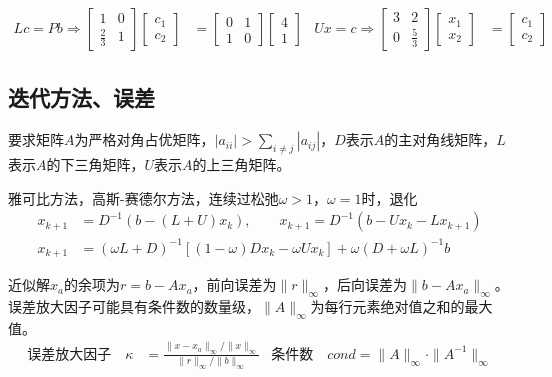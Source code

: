 \documentclass[twocolumn]{article}
\begin{document}
\begin{align*}
    Lc=Pb\Rightarrow
    \begin{bmatrix}
        1           & 0 \\
        \frac{2}{3} & 1
    \end{bmatrix}
    \begin{bmatrix}
        c_1 \\
        c_2
    \end{bmatrix}
     & =
    \begin{bmatrix}
        0 & 1 \\
        1 & 0
    \end{bmatrix}
    \begin{bmatrix}
        4 \\
        1
    \end{bmatrix}
     &
    Ux=c \Rightarrow
    \begin{bmatrix}
        3 & 2           \\
        0 & \frac{5}{3}
    \end{bmatrix}
    \begin{bmatrix}
        x_1 \\
        x_2
    \end{bmatrix}
     & =
    \begin{bmatrix}
        c_1 \\
        c_2
    \end{bmatrix}
\end{align*}

\subsection{迭代方法、误差}
要求矩阵$A$为严格对角占优矩阵，$|a_{ii}|>\sum_{i\neq j}|a_{ij}|$，$D$表示$A$的主对角线矩阵，$L$表示$A$的下三角矩阵，$U$表示$A$的上三角矩阵。

雅可比方法，高斯-赛德尔方法，连续过松弛$\omega>1$，$\omega=1$时，退化
\begin{align*}
    x_{k+1}&=D^{-1}(b-(L+U)x_k),  \qquad  x_{k+1}=D^{-1}(b-Ux_k-Lx_{k+1})\\
    x_{k+1}&=(\omega L+D)^{-1}[(1-\omega)Dx_k-\omega Ux_k]+\omega(D+\omega L)^{-1}b
\end{align*}

近似解$x_a$的余项为$r=b-Ax_a$，前向误差为$\|r\|_\infty$，后向误差为$\|b-Ax_a\|_\infty$。误差放大因子可能具有条件数的数量级，$\|A\|_\infty$为每行元素绝对值之和的最大值。
\begin{align*}
    \text{误差放大因子}\quad\kappa&=\frac{\|x-x_a\|_\infty/\|x\|_\infty}{\|r\|_\infty/\|b\|_\infty} & \text{条件数}\quad cond=\|A\|_\infty\cdot\|A^{-1}\|_\infty
\end{align*}
\end{document}
